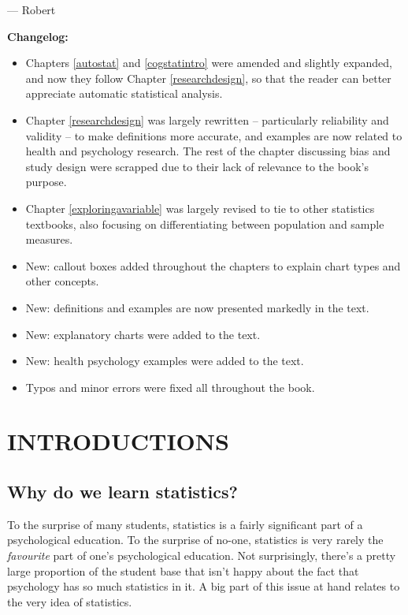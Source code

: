 \documentclass[
  11pt,
  a4paper,
  twoside,symmetric,openright]{book}
\providecommand{\tightlist}{%
  \setlength{\itemsep}{0pt}\setlength{\parskip}{0pt}}
\theoremstyle{break}
\theoremstyle{break}
\begin{document}
\nopagebreak[4]

--- Robert

\textbf{Changelog:}

\begin{itemize}
\tightlist
\item
  Chapters \ref{autostat} and \ref{cogstatintro} were amended and slightly expanded, and now they follow Chapter \ref{researchdesign}, so that the reader can better appreciate automatic statistical analysis.
\item
  Chapter \ref{researchdesign} was largely rewritten -- particularly reliability and validity -- to make definitions more accurate, and examples are now related to health and psychology research. The rest of the chapter discussing bias and study design were scrapped due to their lack of relevance to the book's purpose.
\item
  Chapter \ref{exploringavariable} was largely revised to tie to other statistics textbooks, also focusing on differentiating between population and sample measures.
\item
  New: callout boxes added throughout the chapters to explain chart types and other concepts.
\item
  New: definitions and examples are now presented markedly in the text.
\item
  New: explanatory charts were added to the text.
\item
  New: health psychology examples were added to the text.
\item
  Typos and minor errors were fixed all throughout the book.
\end{itemize}

\newpage

\setcounter{page}{1}

\hypertarget{part-introductions}{%
\part*{INTRODUCTIONS}\label{part-introductions}}

\hypertarget{whywhywhy}{%
\chapter{Why do we learn statistics?}\label{whywhywhy}}

To the surprise of many students, statistics is a fairly significant part of a psychological education. To the surprise of no-one, statistics is very rarely the \emph{favourite} part of one's psychological education. Not surprisingly, there's a pretty large proportion of the student base that isn't happy about the fact that psychology has so much statistics in it. A big part of this issue at hand relates to the very idea of statistics.
\end{document}
